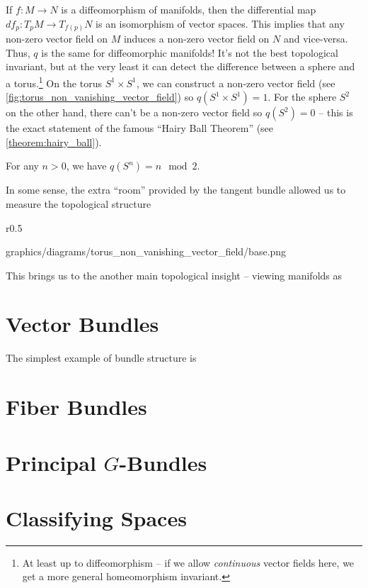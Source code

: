 If $f : M \to N$ is a diffeomorphism of manifolds, then the differential map $df_p : T_p M \to T_{f(p)} N$ is an isomorphism of vector spaces. This implies that any non-zero vector field on $M$ induces a non-zero vector field on $N$ and vice-versa. Thus, $q$ is the same for diffeomorphic manifolds!
It's not the best topological invariant, but at the very least it can detect the difference between a sphere and a torus.\footnote{At least up to diffeomorphism -- if we allow \emph{continuous} vector fields here, we get a more general homeomorphism invariant.} 
On the torus $S^1\times S^1$, we can construct a non-zero vector field (see \cref{fig:torus_non_vanishing_vector_field}) so $q(S^1\times S^1)=1$. For the sphere $S^2$ on the other hand, there can't be a non-zero vector field so $q(S^2)=0$ -- this is the exact statement of the famous ``Hairy Ball Theorem'' (see \cref{theorem:hairy_ball}).

\begin{theorem}\label{theorem:hairy_ball}
  For any $n>0$, we have $q(S^n) = n\mod 2$. 
\end{theorem}

In some sense, the extra ``room'' provided by the tangent bundle allowed us to measure the topological structure 


\begin{wrapfigure}{r}{0.5\textwidth}
	\centering
	\begin{lkx_diagram}{graphics/diagrams/torus_non_vanishing_vector_field/base.png}
	\end{lkx_diagram}
	\caption{A non-zero vector field on a torus.}\label{fig:torus_non_vanishing_vector_field}
\end{wrapfigure}

\vspace{1em}


%
This brings us to the another main topological insight -- viewing manifolds as 
%

{\color{red}\lipsum[1-2]}

\section{Vector Bundles}

The simplest example of bundle structure is 

\section{Fiber Bundles}

\section{Principal \texorpdfstring{$G$}{G}-Bundles}

\cite{milnor1963groups}

\section{Classifying Spaces}\label{sec:classifying_spaces}
